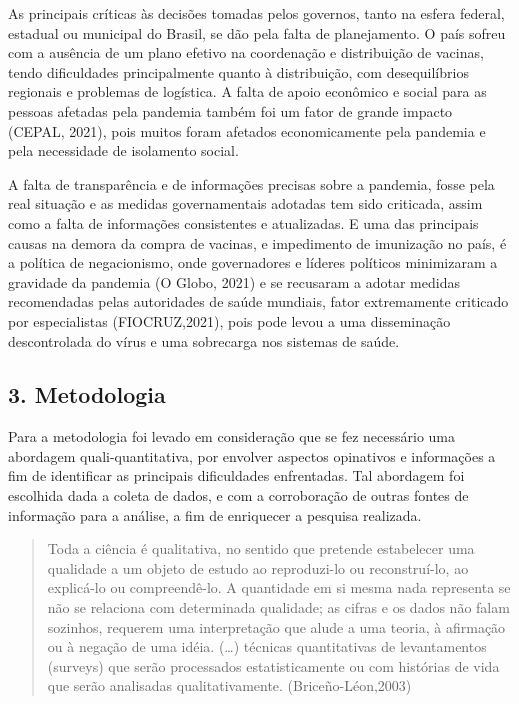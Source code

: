 \documentclass[
]{article}
\begin{document}
As principais críticas às decisões tomadas pelos governos, tanto na
esfera federal, estadual ou municipal do Brasil, se dão pela falta de
planejamento. O país sofreu com a ausência de um plano efetivo na
coordenação e distribuição de vacinas, tendo dificuldades principalmente
quanto à distribuição, com desequilíbrios regionais e problemas de
logística. A falta de apoio econômico e social para as pessoas afetadas
pela pandemia também foi um fator de grande impacto (CEPAL, 2021), pois
muitos foram afetados economicamente pela pandemia e pela necessidade de
isolamento social.

A falta de transparência e de informações precisas sobre a pandemia,
fosse pela real situação e as medidas governamentais adotadas tem sido
criticada, assim como a falta de informações consistentes e atualizadas.
E uma das principais causas na demora da compra de vacinas, e
impedimento de imunização no país, é a política de negacionismo, onde
governadores e líderes políticos minimizaram a gravidade da pandemia (O
Globo, 2021) e se recusaram a adotar medidas recomendadas pelas
autoridades de saúde mundiais, fator extremamente criticado por
especialistas (FIOCRUZ,2021), pois pode levou a uma disseminação
descontrolada do vírus e uma sobrecarga nos sistemas de saúde.

\hypertarget{metodologia}{%
\subsection{3. Metodologia}\label{metodologia}}

Para a metodologia foi levado em consideração que se fez necessário uma
abordagem quali-quantitativa, por envolver aspectos opinativos e
informações a fim de identificar as principais dificuldades enfrentadas.
Tal abordagem foi escolhida dada a coleta de dados, e com a corroboração
de outras fontes de informação para a análise, a fim de enriquecer a
pesquisa realizada.

\begin{quote}
Toda a ciência é qualitativa, no sentido que pretende estabelecer uma
qualidade a um objeto de estudo ao reproduzi-lo ou reconstruí-lo, ao
explicá-lo ou compreendê-lo. A quantidade em si mesma nada representa se
não se relaciona com determinada qualidade; as cifras e os dados não
falam sozinhos, requerem uma interpretação que alude a uma teoria, à
afirmação ou à negação de uma idéia. (\ldots) técnicas quantitativas de
levantamentos (surveys) que serão processados estatisticamente ou com
histórias de vida que serão analisadas qualitativamente.
(Briceño-Léon,2003)
\end{quote}
\end{document}
